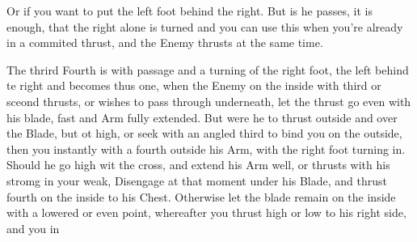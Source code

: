 \newpage


\newpage


Or if you want  to put the left foot behind the right. But is he
passes, it is enough, that the right alone is turned and you can use
this when you're already in a commited thrust, and the Enemy thrusts
at the same time.

The thrird Fourth is with passage and a turning of the right foot, the
left behind te right and becomes thus one, when the Enemy on the
inside with third or sceond thrusts, or wishes to pass through
underneath, let the thrust go even with his blade, fast and Arm fully extended.
But were he to thrust outside and over the Blade, but ot high, or seek
with an angled third to bind you on the outside, then you instantly
with a fourth outside his Arm, with the right foot turning in. Should
he go high wit the cross, and extend his Arm well, or thrusts with his
stromg in your weak, Disengage at that moment under his Blade, and
thrust fourth on the inside to his Chest.
Otherwise let the blade remain on the inside with a lowered or even
point, whereafter you thrust high or low to his right side, and you in
